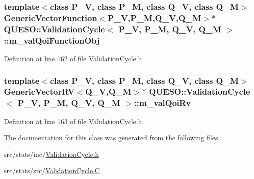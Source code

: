 \hypertarget{class_q_u_e_s_o_1_1_validation_cycle_a35443093bebe1ddbab7fa7cb671be562}{
\subsubsection[{m\-\_\-val\-Qoi\-Function\-Obj}]{\setlength{\rightskip}{0pt plus 5cm}template$<$class P\-\_\-\-V, class P\-\_\-\-M, class Q\-\_\-\-V, class Q\-\_\-\-M$>$ {\bf Generic\-Vector\-Function}$<$P\-\_\-\-V,P\-\_\-\-M,Q\-\_\-\-V,Q\-\_\-\-M$>$$\ast$ {\bf Q\-U\-E\-S\-O\-::\-Validation\-Cycle}$<$ P\-\_\-\-V, P\-\_\-\-M, Q\-\_\-\-V, Q\-\_\-\-M $>$\-::m\-\_\-val\-Qoi\-Function\-Obj\hspace{0.3cm}{\ttfamily [private]}}}\label{class_q_u_e_s_o_1_1_validation_cycle_a35443093bebe1ddbab7fa7cb671be562}


Definition at line 162 of file Validation\-Cycle.\-h.

\hypertarget{class_q_u_e_s_o_1_1_validation_cycle_a930f8140c5ba8655ea6ce926acc6ceef}{
\subsubsection[{m\-\_\-val\-Qoi\-Rv}]{\setlength{\rightskip}{0pt plus 5cm}template$<$class P\-\_\-\-V, class P\-\_\-\-M, class Q\-\_\-\-V, class Q\-\_\-\-M$>$ {\bf Generic\-Vector\-R\-V}$<$Q\-\_\-\-V,Q\-\_\-\-M$>$$\ast$ {\bf Q\-U\-E\-S\-O\-::\-Validation\-Cycle}$<$ P\-\_\-\-V, P\-\_\-\-M, Q\-\_\-\-V, Q\-\_\-\-M $>$\-::m\-\_\-val\-Qoi\-Rv\hspace{0.3cm}{\ttfamily [private]}}}\label{class_q_u_e_s_o_1_1_validation_cycle_a930f8140c5ba8655ea6ce926acc6ceef}


Definition at line 163 of file Validation\-Cycle.\-h.



The documentation for this class was generated from the following files\-:\begin{DoxyCompactItemize}
\item 
src/stats/inc/\hyperlink{_validation_cycle_8h}{Validation\-Cycle.\-h}\item 
src/stats/src/\hyperlink{_validation_cycle_8_c}{Validation\-Cycle.\-C}\end{DoxyCompactItemize}
